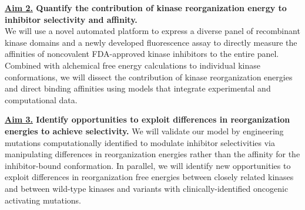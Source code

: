 \documentclass[11pt]{article}
\begin{document}
{\bf \underline{Aim 2.} Quantify the contribution of kinase reorganization energy to inhibitor selectivity and affinity.}\\
We will use a novel automated platform to express a diverse panel of recombinant kinase domains and a newly developed fluorescence assay to directly measure the affinities of noncovalent FDA-approved kinase inhibitors to the entire panel.
Combined with alchemical free energy calculations to individual kinase conformations, we will dissect the contribution of kinase reorganization energies and direct binding affinities using models that integrate experimental and computational data.

{\bf \underline{Aim 3.} Identify opportunities to exploit differences in reorganization energies to achieve selectivity.}
We will validate our model by engineering mutations computationally identified to modulate inhibitor selectivities via manipulating differences in reorganization energies rather than the affinity for the inhibitor-bound conformation.
In parallel, we will identify new opportunities to exploit differences in reorganization free energies between closely related kinases and between wild-type kinases and variants with clinically-identified oncogenic activating mutations.
\end{document}
